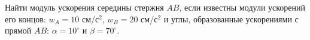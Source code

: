 Найти модуль ускорения середины стержня $AB$,
если известны модули ускорений его концов: $w_A = 10$ см/с$^2$,
$w_B = 20$ см/с$^2$ и углы, образованные ускорениями с прямой $AB$:
$\alpha = 10^\circ$ и $\beta = 70^\circ$.
